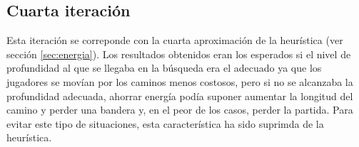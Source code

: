 \subsection{Cuarta iteración}
Esta iteración se correponde con la cuarta aproximación de la
heurística (ver sección \ref{sec:energia}). Los resultados obtenidos
eran los esperados si el nivel de profundidad al que se llegaba en la
búsqueda era el adecuado ya que los jugadores se movían por los
caminos menos costosos, pero si no se alcanzaba la profundidad
adecuada, ahorrar energía podía suponer aumentar la longitud del
camino y perder una bandera y, en el peor de los casos, perder la
partida. Para evitar este tipo de situaciones, esta característica ha
sido suprimda de la heurística.